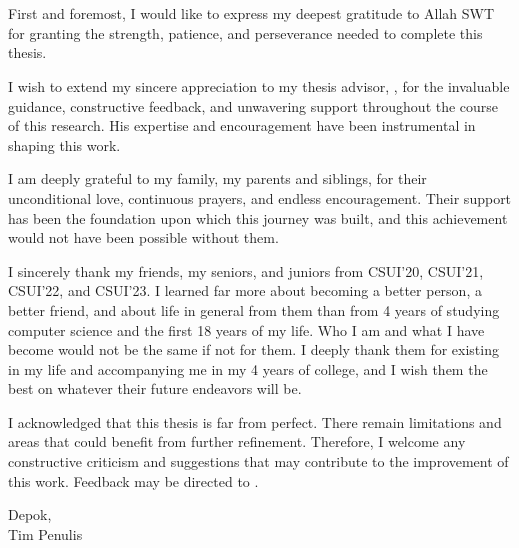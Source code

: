 \pagestyle{onlypage}
\chapter*{\kataPengantar}
First and foremost, I would like to express my deepest gratitude to Allah SWT for granting the strength, patience, and perseverance needed to complete this thesis.

I wish to extend my sincere appreciation to my thesis advisor, \pembimbingSatu, for the invaluable guidance, constructive feedback, and unwavering support throughout the course of this research. His expertise and encouragement have been instrumental in shaping this work.

I am deeply grateful to my family, my parents and siblings, for their unconditional love, continuous prayers, and endless encouragement. Their support has been the foundation upon which this journey was built, and this achievement would not have been possible without them.

I sincerely thank my friends, my seniors, and juniors from CSUI'20, CSUI'21, CSUI'22, and CSUI'23. I learned far more about becoming a better person, a better friend, and about life in general from them than from 4 years of studying computer science and the first 18 years of my life. Who I am and what I have become would not be the same if not for them. I deeply thank them for existing in my life and accompanying me in my 4 years of college, and I wish them the best on whatever their future endeavors will be.  

I acknowledged that this thesis is far from perfect. There remain limitations and areas that could benefit from further refinement. Therefore, I welcome any constructive criticism and suggestions that may contribute to the improvement of this work. Feedback may be directed to .


\vspace*{0.1cm}
\begin{flushright}
Depok, \tanggalSiapSidang\\[0.1cm]
\ifx\blank\npmDua
	\vspace*{1.5cm}
	\penulisSatu
\else
	Tim Penulis
\fi

\end{flushright}
